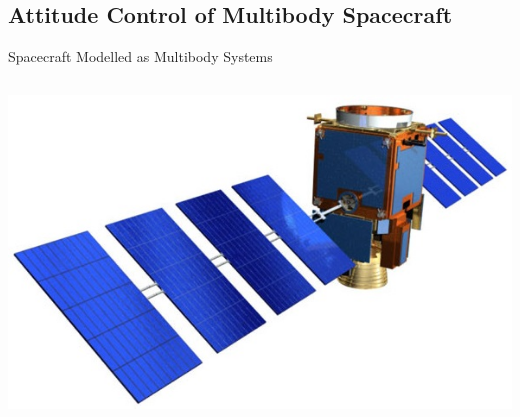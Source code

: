 \documentclass{beamer}
\begin{document}
\subsection{Attitude Control of Multibody Spacecraft}
\begin{frame}{Spacecraft Modelled as Multibody Systems}
\begin{columns}
\includegraphics[width=\textwidth]{images/satellite.jpg}

\end{columns}
\end{frame}
\end{document}
